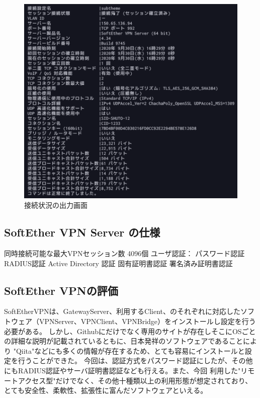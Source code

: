 \documentclass[11pt,a4j,titlepage]{jreport}
\begin{document}
\begin{figure}[H]
    \centering
    \includegraphics*[width=1.0\textwidth,page=1]{graphs/accountstatusget.png}
    \caption{接続状況の出力画面}
    \label{accountstatusget}
\end{figure}


\subsection*{SoftEther VPN Server の仕様}
同時接続可能な最大VPNセッション数
4096個
ユーザ認証：
パスワード認証
RADIUS認証
Active Directory 認証
固有証明書認証
署名済み証明書認証
\fi





\subsection*{SoftEther VPNの評価}
SoftEtherVPNは、GatewayServer、利用するClient、のそれぞれに対応したソフトウェア（VPNServer、VPNClient、VPNBridge）をインストールし設定を行う必要がある。
しかし、Githubにだけでなく専用のサイトが存在しそこにOSごとの詳細な説明が記載されているともに、日本発祥のソフトウェアであることにより
"Qiita"などにも多くの情報が存在するため、とても容易にインストールと設定を行うことができた。
今回は、認証方式をパスワード認証にしたが、その他にもRADIUS認証やサーバ証明書認証なども行える。また、今回
利用した"リモートアクセス型"だけでなく、その他十種類以上の利用形態が想定されており、
とても安全性、柔軟性、拡張性に富んだソフトウェアといえる。
\end{document}
